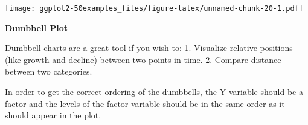 \documentclass[a4paper]{article}
\newenvironment{Shaded}{\begin{snugshade}}{\end{snugshade}}
\newcommand{\KeywordTok}[1]{\textcolor[rgb]{0.13,0.29,0.53}{\textbf{#1}}}
\newcommand{\DataTypeTok}[1]{\textcolor[rgb]{0.13,0.29,0.53}{#1}}
\newcommand{\StringTok}[1]{\textcolor[rgb]{0.31,0.60,0.02}{#1}}
\newcommand{\CommentTok}[1]{\textcolor[rgb]{0.56,0.35,0.01}{\textit{#1}}}
\newcommand{\OperatorTok}[1]{\textcolor[rgb]{0.81,0.36,0.00}{\textbf{#1}}}
\newcommand{\NormalTok}[1]{#1}
\begin{document}
\texttt{[image: ggplot2-50examples\_files/figure-latex/unnamed-chunk-20-1.pdf]}

\newpage

\textbf{Dumbbell Plot}

Dumbbell charts are a great tool if you wish to: 1. Visualize relative
positions (like growth and decline) between two points in time. 2.
Compare distance between two categories.

In order to get the correct ordering of the dumbbells, the Y variable
should be a factor and the levels of the factor variable should be in
the same order as it should appear in the plot.

\begin{Shaded}
\end{Shaded}
\end{document}
